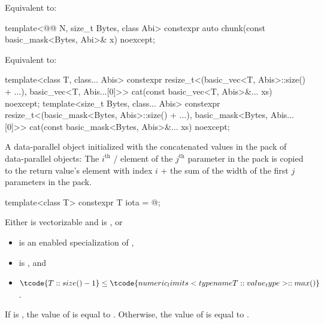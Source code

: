 \begin{itemdescr}
\pnum
\effects
Equivalent to: 
\end{itemdescr}

\begin{itemdecl}
template<@@ N, size_t Bytes, class Abi>
  constexpr auto chunk(const basic_mask<Bytes, Abi>& x) noexcept;
\end{itemdecl}

\begin{itemdescr}
\pnum
\effects
Equivalent to: 
\end{itemdescr}

\begin{itemdecl}
template<class T, class... Abis>
  constexpr resize_t<(basic_vec<T, Abis>::size() + ...),
    basic_vec<T, Abis...[0]>> cat(const basic_vec<T, Abis>&... xs) noexcept;
template<size_t Bytes, class... Abis>
  constexpr resize_t<(basic_mask<Bytes, Abis>::size() + ...),
    basic_mask<Bytes, Abis...[0]>> cat(const basic_mask<Bytes, Abis>&... xs) noexcept;
\end{itemdecl}

\begin{itemdescr}
\pnum
\returns
A data-parallel object initialized with the concatenated values in the
 pack of data-parallel objects: The $i^\text{th}$
/ element of the $j^\text{th}$
parameter in the  pack is copied to the return value's element with
index $i$ + the sum of the width of the first $j$ parameters in the 
pack.
\end{itemdescr}

\begin{itemdecl}
template<class T> constexpr T iota = @\seebelow@;
\end{itemdecl}

\begin{itemdescr}
\pnum
\mandates
Either  is vectorizable and  is , or
\begin{itemize}
\item {} is an enabled specialization of ,
\item {} is , and
\item $\tcode{T::size() - 1} \le \tcode{numeric_limits<typename T::value_type>::max()}$.
\end{itemize}

\pnum
\remarks
If  is ,
the value of  is equal to .
Otherwise, the value of  is equal to
.
\end{itemdescr}


